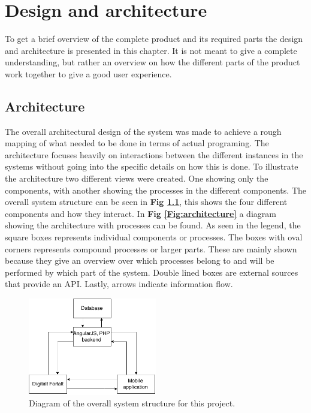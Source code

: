 
\chapter{Design and architecture}

To get a brief overview of the complete product and its required parts the design and architecture is presented in this chapter. It is not meant to give a complete understanding, but rather an overview on how the different parts of the product work together to give a good user experience.

\section{Architecture}

The overall architectural design of the system was made to achieve a rough mapping of what needed to be done in terms of actual programing. The architecture focuses heavily on interactions between the different instances in the systems without going into the specific details on how this is done. To illustrate the architecture two different views were created. One showing only the components, with another showing the processes in the different components. The overall system structure can be seen in \textbf{Fig \ref{Fig:system_structure}}, this shows the four different components and how they interact. In \textbf{Fig \ref{Fig:architecture}} a diagram showing the architecture with processes can be found. As seen in the legend, the square boxes represents individual components or processes. The boxes with oval corners represents compound processes or larger parts. These are mainly shown because they give an overview over which processes belong to and will be performed by which part of the system. Double lined boxes are external sources that provide an API. Lastly, arrows indicate information flow.

\begin{figure}[h!]
	\centering
	\includegraphics[width=0.5\textwidth]{fig/system_structure}
	\caption{Diagram of the overall system structure for this project.}
	\label{Fig:system_structure}
\end{figure}

